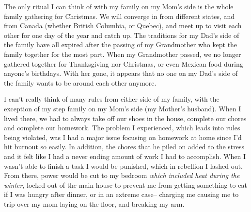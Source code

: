 \documentclass[12pt]{article}
\begin{document}
\par
The only ritual I can think of with my family on my Mom's side is the whole family gathering for Christmas. We will converge in from different states, and from Canada (whether British Columbia, or Quebec), and meet up to visit each other for one day of the year and catch up. The traditions for my Dad's side of the family have all expired after the passing of my Grandmother who kept the family together for the most part. When my Grandmother passed, we no longer gathered together for Thanksgiving nor Christmas, or even Mexican food during anyone's birthdays. With her gone, it appears that no one on my Dad's side of the family wants to be around each other anymore.
\par
I can't really think of many rules from either side of my family, with the exception of my step family on my Mom's side (my Mother's husband). When I lived there, we had to always take off our shoes in the house, complete our chores and complete our homework. The problem I experienced, which leads into rules being violated, was I had a major issue focusing on homework at home since I'd hit burnout so easily. In addition, the chores that he piled on added to the stress and it felt like I had a never ending amount of work I had to accomplish. When I wasn't able to finish a task I would be punished, which in rebellion I lashed out. From there, power would be cut to my bedroom \emph{which included heat during the winter}, locked out of the main house to prevent me from getting something to eat if I was hungry after dinner, or in an extreme case-- charging me causing me to trip over my mom laying on the floor, and breaking my arm.
\end{document}
